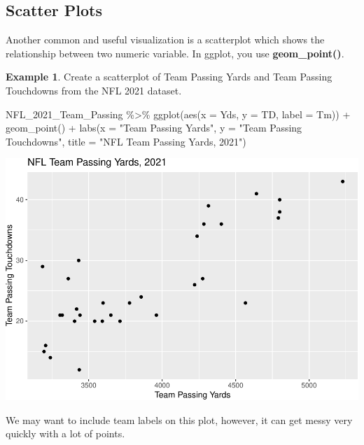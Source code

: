 \documentclass[
  11pt,
]{book}
\newenvironment{Shaded}{\begin{snugshade}}{\end{snugshade}}
\newcommand{\AttributeTok}[1]{\textcolor[rgb]{0.77,0.63,0.00}{#1}}
\newcommand{\FunctionTok}[1]{\textcolor[rgb]{0.00,0.00,0.00}{#1}}
\newcommand{\NormalTok}[1]{#1}
\newcommand{\SpecialCharTok}[1]{\textcolor[rgb]{0.00,0.00,0.00}{#1}}
\newcommand{\StringTok}[1]{\textcolor[rgb]{0.31,0.60,0.02}{#1}}
\theoremstyle{definition}
\theoremstyle{definition}
\newtheorem{example}{Example}[chapter]
\theoremstyle{definition}
\theoremstyle{definition}
\theoremstyle{remark}
\begin{document}
\vfill
\newpage

\hypertarget{scatter-plots}{%
\subsection{Scatter Plots}\label{scatter-plots}}

Another common and useful visualization is a scatterplot which shows the relationship between two numeric variable. In ggplot, you use \textbf{geom\_point()}.

\begin{example}
Create a scatterplot of Team Passing Yards and Team Passing Touchdowns from the NFL 2021 dataset.

\begin{Shaded}
\begin{Highlighting}[]
\NormalTok{NFL\_2021\_Team\_Passing }\SpecialCharTok{\%\textgreater{}\%}
    \FunctionTok{ggplot}\NormalTok{(}\FunctionTok{aes}\NormalTok{(}\AttributeTok{x =}\NormalTok{ Yds, }\AttributeTok{y =}\NormalTok{ TD, }\AttributeTok{label =}\NormalTok{ Tm)) }\SpecialCharTok{+} \FunctionTok{geom\_point}\NormalTok{() }\SpecialCharTok{+} \FunctionTok{labs}\NormalTok{(}\AttributeTok{x =} \StringTok{"Team Passing Yards"}\NormalTok{,}
    \AttributeTok{y =} \StringTok{"Team Passing Touchdowns"}\NormalTok{, }\AttributeTok{title =} \StringTok{"NFL Team Passing Yards, 2021"}\NormalTok{)}
\end{Highlighting}
\end{Shaded}

\includegraphics{series_files/figure-latex/scatter1-1.pdf}

\vfill
\newpage

We may want to include team labels on this plot, however, it can get messy very quickly with a lot of points.


\end{example}
\end{document}
